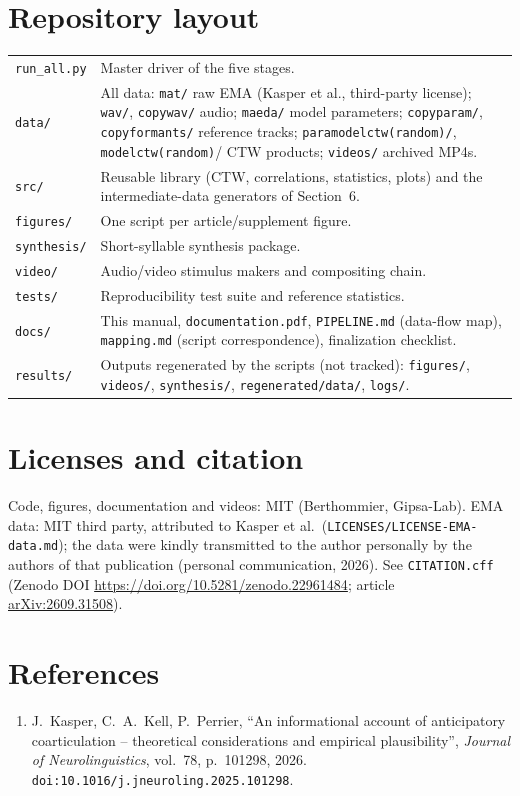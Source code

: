 \documentclass[11pt,a4paper]{article}
\begin{document}
\section{Repository layout}
\begin{longtable}{p{4.2cm}p{10.5cm}}
\texttt{run\_all.py} & Master driver of the five stages.\\
\texttt{data/} & All data: \texttt{mat/} raw EMA (Kasper et al.,
third-party license); \texttt{wav/}, \texttt{copywav/} audio;
\texttt{maeda/} model parameters; \texttt{copyparam/},
\texttt{copyformants/} reference tracks; \texttt{paramodelctw(random)/},
\texttt{modelctw(random)}/ CTW products; \texttt{videos/} archived MP4s.\\
\texttt{src/} & Reusable library (CTW, correlations, statistics, plots)
and the intermediate-data generators of Section~6.\\
\texttt{figures/} & One script per article/supplement figure.\\
\texttt{synthesis/} & Short-syllable synthesis package.\\
\texttt{video/} & Audio/video stimulus makers and compositing chain.\\
\texttt{tests/} & Reproducibility test suite and reference statistics.\\
\texttt{docs/} & This manual, \texttt{documentation.pdf},
\texttt{PIPELINE.md} (data-flow map), \texttt{mapping.md} (script
correspondence), finalization checklist.\\
\texttt{results/} & Outputs regenerated by the scripts (not tracked):
\texttt{figures/}, \texttt{videos/}, \texttt{synthesis/},
\texttt{regenerated/data/}, \texttt{logs/}.\\
\end{longtable}

\section{Licenses and citation}
Code, figures, documentation and videos: MIT (Berthommier, Gipsa-Lab).
EMA data: MIT third party, attributed to Kasper et al.\
(\texttt{LICENSES/LICENSE-EMA-data.md}); the data were kindly transmitted
to the author personally by the authors of that publication (personal
communication, 2026). See \texttt{CITATION.cff} (Zenodo DOI
\url{https://doi.org/10.5281/zenodo.22961484}; article
\href{https://arxiv.org/abs/2609.31508}{arXiv:2609.31508}).

\section*{References}
\begin{enumerate}
\item J.~Kasper, C.~A.~Kell, P.~Perrier,
``An informational account of anticipatory coarticulation -- theoretical
considerations and empirical plausibility'',
\emph{Journal of Neurolinguistics}, vol.~78, p.~101298, 2026.
\texttt{doi:10.1016/j.jneuroling.2025.101298}.
\end{enumerate}
\end{document}
